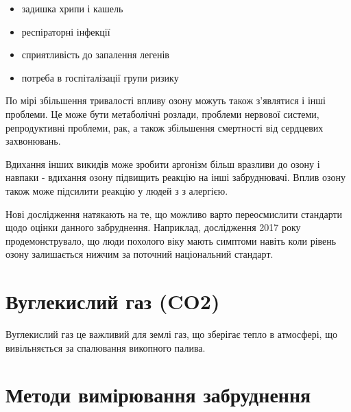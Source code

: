 \begin{itemize}
    \item задишка хрипи і кашель
    \item респіраторні інфекції
    \item сприятливість до запалення легенів
    \item потреба в госпіталізації групи ризику
\end{itemize}

По мірі збільшення тривалості впливу озону можуть також з'являтися і інші проблеми. Це може бути 
метаболічні розлади, проблеми нервової системи, репродуктивні проблеми, рак, а також збільшення 
смертності від сердцевих захвонювань. 

Вдихання інших викидів може зробити аргонізм більш вразливи до озону і навпаки - вдихання озону 
підвищить реакцію на інші забруднювачі. Вплив озону також може підсилити реакцію у людей з 
з алергією.

Нові дослідження натякають на те, що можливо варто переосмислити стандарти щодо оцінки данного
забруднення. Наприклад, дослідження 2017 року продемонструвало, що люди похолого віку мають 
симптоми навіть коли рівень озону залишається нижчим за поточний національний стандарт.


\section{Вуглекислий газ (CO2)}

Вуглекислий газ це важливий для землі газ, що зберігає тепло в атмосфері, що вивільняється за спалювання викопного палива. 




\section{Методи вимірювання забруднення}

